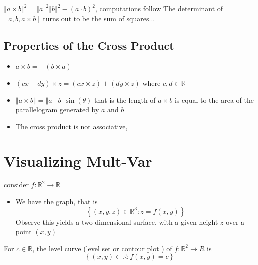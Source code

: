 \documentclass[11pt]{book}
\begin{document}
$\left\Vert a\times b \right\Vert ^2 = \left\Vert a \right\Vert ^2 \left\Vert b \right\Vert ^2  - \left( a \cdot b \right) ^2 $, computations follow 
The determinant of $[a, b, a\times b]$ turns out to be the sum of squares...

\subsection{Properties of the Cross Product}%
\label{sub:properties_of_the_cross_product}

\begin{itemize}
    \item $a\times b =  - \left( b\times a \right) $
    \item $\left( cx + dy \right)\times z = \left( cx \times z \right)  + \left( dy\times z \right)  $ where $c, d \in \mathbb{R} $ 
    \item $\left\Vert a\times b \right\Vert = \left\Vert a \right\Vert \left\Vert b \right\Vert \sin  \left( \theta \right) $ that is the length of $a\times b$ is equal to the area of the parallelogram generated by $a \text{ and } b$  
        \item The cross product is not associative,  
\end{itemize}



\section{Visualizing Mult-Var}%
\label{sec:visualizing_mult_var}

consider $f : \mathbb{R} ^2  \to \mathbb{R}  $ 
\begin{itemize}
    \item We have the graph, that is 
        \[
            \left\{ \left( x,y, z \right) \in  \mathbb{R} ^{3} : z= f\left(x, y\right)  \right\}    
        \]
        Observe this yields a two-dimensional surface, with a given height $z$ over a point $\left( x,y \right) $ 
\end{itemize}

\begin{defn}\label{defn:level_curve}
    For $c \in  \mathbb{R} $,  the level curve (level set or contour plot ) of $f : \mathbb{R} ^2  \to R $ is 
    \[
        \left\{ \left( x, y \right) \in \mathbb{R} : f\left(x,y\right) = c \right\} 
    \]
\end{defn}
\end{document}
